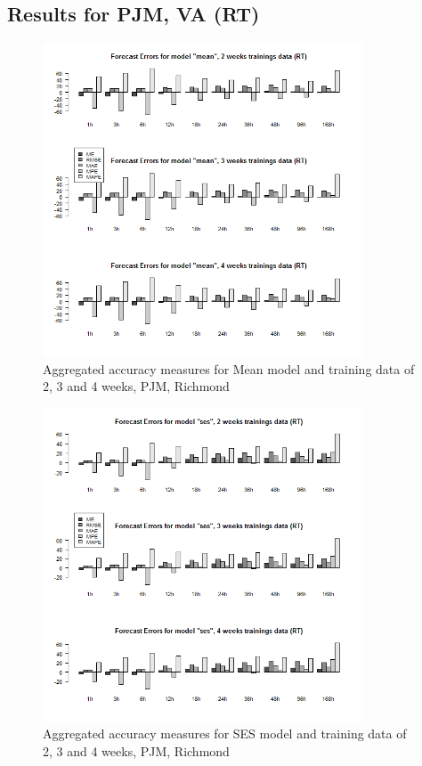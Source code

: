 \FloatBarrier
\subsection{Results for PJM, VA (RT)}



\begin{figure}[!ht]
	\centering
		\includegraphics[width=0.85\textwidth]{figures/appendix_forecast_results/rt_sim_6_x_1w_1w_mean.png}
	\caption{Aggregated accuracy measures for Mean model and training data of 2, 3 and 4 weeks, PJM, Richmond}
	\label{fig:app_rt_sim_6_x_1w_1w_mean}
\end{figure}



\begin{figure}[!ht]
	\centering
	\vspace*{-1.2in}
		\includegraphics[width=0.85\textwidth]{figures/appendix_forecast_results/rt_sim_6_x_1w_1w_ses.png}
	\caption{Aggregated accuracy measures for SES model and training data of 2, 3 and 4 weeks, PJM, Richmond}
	\label{fig:app_rt_sim_6_x_1w_1w_ses}
\end{figure}


